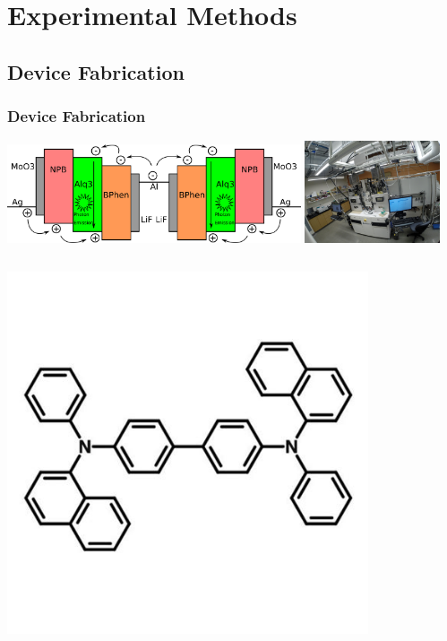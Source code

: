 \documentclass{beamer}
\begin{document}
\section{Experimental Methods}
    \frame{\tableofcontents[currentsection]}
    \subsection{Device Fabrication}
		\begin{frame}
			\frametitle{Device Fabrication}
			\centering
			\includegraphics[width=0.65\textwidth]{images/microcavity_band_diagram.png}
			\includegraphics[width=0.3\textwidth]{images/evaporator.jpg}
			\vspace{0.5cm}
			\begin{columns}
				\begin{column}{0.3\textwidth}
					\centering
					\includegraphics[width=0.8\textwidth]{images/npb_structure.jpg}\\

\end{column}
\end{columns}
\end{frame}
\end{document}
